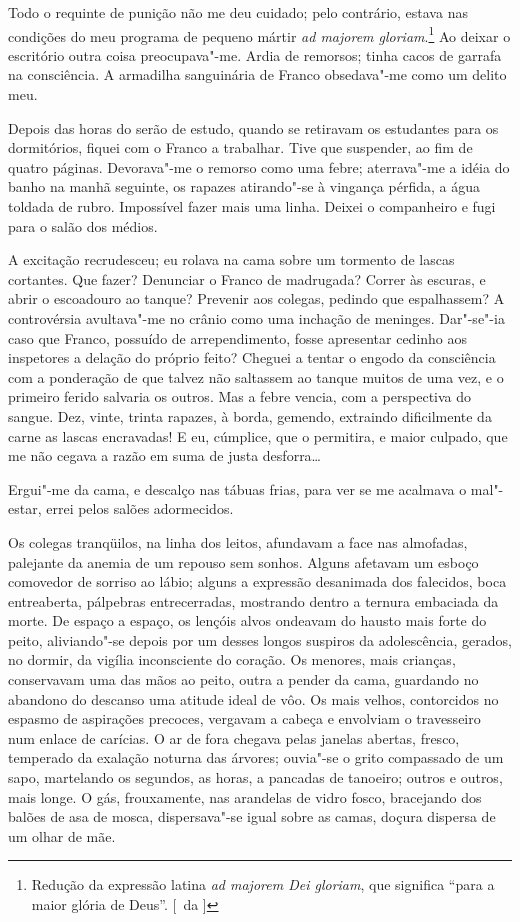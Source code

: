 Todo o requinte de punição não me deu cuidado; pelo
contrário, estava nas condições do meu programa de pequeno mártir \textit{ad
majorem gloriam}.\footnote{ Redução da expressão latina \textit{ad majorem Dei gloriam}, 
que significa ``para a maior glória de Deus''. [~da ]} 
Ao deixar o escritório outra coisa preocupava"-me.
Ardia de remorsos; tinha cacos de garrafa na consciência. A armadilha
sanguinária de Franco obsedava"-me como um delito meu. 

Depois das horas do serão de estudo, quando se retiravam os estudantes para os
dormitórios, fiquei com o Franco a trabalhar. Tive que suspender, ao
fim de quatro páginas. Devorava"-me o remorso como uma febre;
aterrava"-me a idéia do banho na manhã seguinte, os rapazes
atirando"-se à vingança pérfida, a água toldada de rubro. Impossível
fazer mais uma linha. Deixei o companheiro e fugi para o salão dos médios. 

A excitação recrudesceu; eu rolava na cama sobre um tormento de
lascas cortantes. Que fazer? Denunciar o Franco de madrugada? Correr às
escuras, e abrir o escoadouro ao tanque? Prevenir aos colegas, pedindo
que espalhassem? A controvérsia avultava"-me no crânio como uma
inchação de meninges. Dar"-se"-ia caso que Franco, possuído de
arrependimento, fosse apresentar cedinho aos inspetores a delação do
próprio feito? Cheguei a tentar o engodo da consciência com a
ponderação de que talvez não saltassem ao tanque muitos de uma vez, e o
primeiro ferido salvaria os outros. Mas a febre vencia, com a
perspectiva do sangue. Dez, vinte, trinta rapazes, à borda, gemendo,
extraindo dificilmente da carne as lascas encravadas! E eu, cúmplice,
que o permitira, e maior culpado, que me não cegava a razão em suma de
justa desforra\ldots{} 

Ergui"-me da cama, e descalço nas tábuas frias, para
ver se me acalmava o mal"-estar, errei pelos salões adormecidos. 

Os colegas tranqüilos, na linha dos leitos, afundavam a face nas
almofadas, palejante da anemia de um repouso sem sonhos. Alguns
afetavam um esboço comovedor de sorriso ao lábio; alguns a expressão
desanimada dos falecidos, boca entreaberta, pálpebras entrecerradas,
mostrando dentro a ternura embaciada da morte. De espaço a espaço, os
lençóis alvos ondeavam do hausto mais forte do peito, aliviando"-se
depois por um desses longos suspiros da adolescência, gerados, no
dormir, da vigília inconsciente do coração. Os menores, mais crianças,
conservavam uma das mãos ao peito, outra a pender da cama, guardando no
abandono do descanso uma atitude ideal de vôo. Os mais velhos,
contorcidos no espasmo de aspirações precoces, vergavam a cabeça e
envolviam o travesseiro num enlace de carícias. O ar de fora chegava
pelas janelas abertas, fresco, temperado da exalação noturna das
árvores; ouvia"-se o grito compassado de um sapo, martelando os
segundos, as horas, a pancadas de tanoeiro; outros e outros, mais
longe. O gás, frouxamente, nas arandelas de vidro fosco, bracejando dos
balões de asa de mosca, dispersava"-se igual sobre as camas, doçura
dispersa de um olhar de mãe. 


